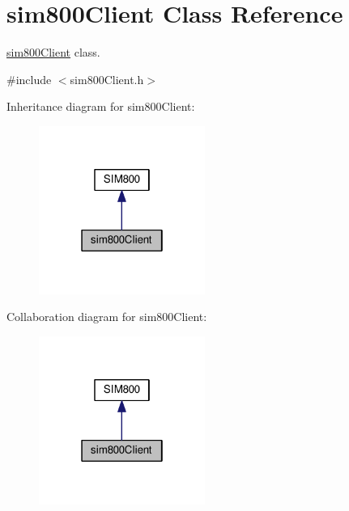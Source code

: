\hypertarget{classsim800Client}{}\section{sim800\+Client Class Reference}
\label{classsim800Client}


\hyperlink{classsim800Client}{sim800\+Client} class.  




{\ttfamily \#include $<$sim800\+Client.\+h$>$}



Inheritance diagram for sim800\+Client\+:
\nopagebreak
\begin{figure}[H]
\begin{center}
\leavevmode
\includegraphics[width=154pt]{classsim800Client__inherit__graph}
\end{center}
\end{figure}


Collaboration diagram for sim800\+Client\+:
\nopagebreak
\begin{figure}[H]
\begin{center}
\leavevmode
\includegraphics[width=154pt]{classsim800Client__coll__graph}
\end{center}
\end{figure}
